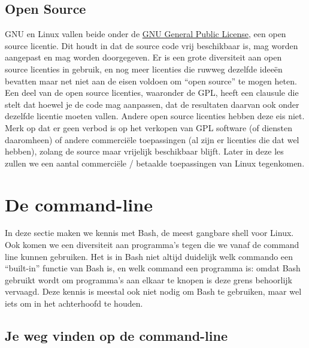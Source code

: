 \subsection{Open Source}\label{open-source}

GNU en Linux vallen beide onder de \href{https://www.gnu.org/copyleft/gpl.html}{GNU General Public License}, een open source licentie. Dit houdt in dat de source code vrij beschikbaar is, mag worden aangepast en mag worden doorgegeven. Er is een grote diversiteit aan open source licenties in gebruik, en nog meer licenties die ruwweg dezelfde ideeën bevatten maar net niet aan de eisen voldoen om ``open source'' te mogen heten. Een deel van de open source licenties, waaronder de GPL, heeft een clausule die stelt dat hoewel je de code mag aanpassen, dat de resultaten daarvan ook onder dezelfde licentie moeten vallen. Andere open source licenties hebben deze eis niet. Merk op dat er geen verbod is op het verkopen van GPL software (of diensten daaromheen) of andere commerciële toepassingen (al zijn er licenties die dat wel hebben), zolang de source maar vrijelijk beschikbaar blijft. Later in deze les zullen we een aantal commerciële / betaalde toepassingen van Linux tegenkomen.

\section{De command-line}

In deze sectie maken we kennis met Bash, de meest gangbare shell voor Linux. Ook komen we een diversiteit aan programma's tegen die we vanaf de command line kunnen gebruiken. Het is in Bash niet altijd duidelijk welk commando een ``built-in'' functie van Bash is, en welk command een programma is: omdat Bash gebruikt wordt om programma's aan elkaar te knopen is deze grens behoorlijk vervaagd. Deze kennis is meestal ook niet nodig om Bash te gebruiken, maar wel iets om in het achterhoofd te houden.

\subsection{Je weg vinden op de command-line}\label{je-weg-vinden-op-de-command-line}

